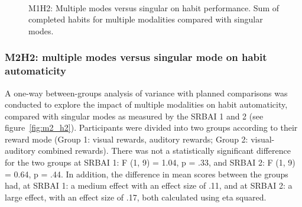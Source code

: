 \begin{figure}
  \centering
  \caption{M1H2: Multiple modes versus singular on habit performance. Sum of completed habits for multiple modalities compared with singular modes.}~\label{fig:m1_h2}
\end{figure}




\subsubsection*{M2H2: multiple modes versus singular mode on habit automaticity}
A one-way between-groups analysis of variance with planned comparisons was conducted to explore the
impact of multiple modalities on habit automaticity, compared with singular modes as measured by the SRBAI 1 and 2 (see figure~\ref{fig:m2_h2}). Participants were divided into two groups according to their reward mode (Group 1: visual rewards, auditory rewards; Group 2: visual-auditory combined rewards). There was not a
statistically significant difference for the two groups at SRBAI 1: F (1, 9) = 1.04, p = .33, and SRBAI 2: F (1, 9) = 0.64, p = .44. In addition, the difference in mean scores between the groups had, at SRBAI 1: a medium effect with an effect size of .11, and at SRBAI 2: a large effect, with an effect size of .17, both calculated using eta squared.

